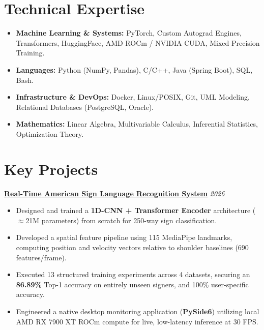 \documentclass[11pt,a4paper]{article}
\begin{document}
\section{Technical Expertise}
\begin{itemize}
    \item \textbf{Machine Learning \& Systems:} PyTorch, Custom Autograd Engines, Transformers, HuggingFace, AMD ROCm / NVIDIA CUDA, Mixed Precision Training.
    \item \textbf{Languages:} Python (NumPy, Pandas), C/C++, Java (Spring Boot), SQL, Bash.
    \item \textbf{Infrastructure \& DevOps:} Docker, Linux/POSIX, Git, UML Modeling, Relational Databases (PostgreSQL, Oracle).
    \item \textbf{Mathematics:} Linear Algebra, Multivariable Calculus, Inferential Statistics, Optimization Theory.
\end{itemize}

\section{Key Projects}

\textbf{\href{https://github.com/rayanakioud7/signlang}{Real-Time American Sign Language Recognition System}} \hfill \textit{2026}
\begin{itemize}
    \item Designed and trained a \textbf{1D-CNN + Transformer Encoder} architecture ($\approx$21M parameters) from scratch for 250-way sign classification.
    \item Developed a spatial feature pipeline using 115 MediaPipe landmarks, computing position and velocity vectors relative to shoulder baselines (690 features/frame).
    \item Executed 13 structured training experiments across 4 datasets, securing an \textbf{86.89\%} Top-1 accuracy on entirely unseen signers, and 100\% user-specific accuracy.
    \item Engineered a native desktop monitoring application (\textbf{PySide6}) utilizing local AMD RX 7900 XT ROCm compute for live, low-latency inference at 30 FPS.
\end{itemize}

\vspace{4pt}
\end{document}
